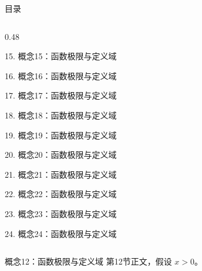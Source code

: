 \documentclass[aspectratio=169,10pt,fontset=fandol]{ctexbeamer}
\begin{document}
\begin{frame}[t,fragile]{目录}
\begin{columns}[T,onlytextwidth]
\begin{column}{0.48\textwidth}
{\color{gray!40}\small 15. 概念15：函数极限与定义域\par}\vspace{0.22em}
{\color{gray!40}\small 16. 概念16：函数极限与定义域\par}\vspace{0.22em}
{\color{gray!40}\small 17. 概念17：函数极限与定义域\par}\vspace{0.22em}
{\color{gray!40}\small 18. 概念18：函数极限与定义域\par}\vspace{0.22em}
{\color{gray!40}\small 19. 概念19：函数极限与定义域\par}\vspace{0.22em}
{\color{gray!40}\small 20. 概念20：函数极限与定义域\par}\vspace{0.22em}
{\color{gray!40}\small 21. 概念21：函数极限与定义域\par}\vspace{0.22em}
{\color{gray!40}\small 22. 概念22：函数极限与定义域\par}\vspace{0.22em}
{\color{gray!40}\small 23. 概念23：函数极限与定义域\par}\vspace{0.22em}
{\color{gray!40}\small 24. 概念24：函数极限与定义域\par}\vspace{0.22em}
\end{column}
\end{columns}
\end{frame}
\begin{frame}[t,fragile]{概念12：函数极限与定义域}
\normalsize
{\normalsize
第12节正文，假设 $x>0$。
}
\end{frame}
\end{document}
